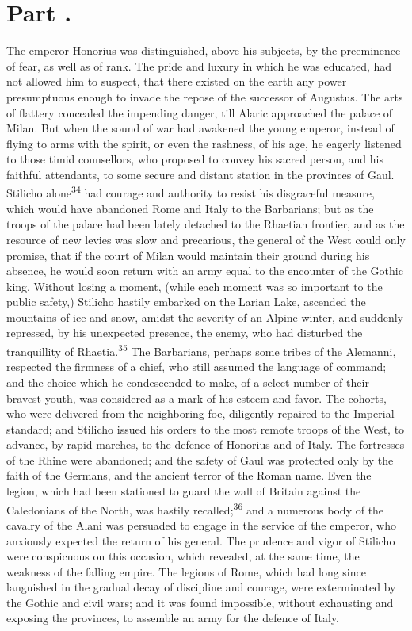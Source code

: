 \section{Part \thesection.}

The emperor Honorius was distinguished, above his subjects, by
the preeminence of fear, as well as of rank. The pride and luxury
in which he was educated, had not allowed him to suspect, that
there existed on the earth any power presumptuous enough to
invade the repose of the successor of Augustus. The arts of
flattery concealed the impending danger, till Alaric approached
the palace of Milan. But when the sound of war had awakened the
young emperor, instead of flying to arms with the spirit, or even
the rashness, of his age, he eagerly listened to those timid
counsellors, who proposed to convey his sacred person, and his
faithful attendants, to some secure and distant station in the
provinces of Gaul. Stilicho alone\textsuperscript{34} had courage and authority to
resist his disgraceful measure, which would have abandoned Rome
and Italy to the Barbarians; but as the troops of the palace had
been lately detached to the Rhaetian frontier, and as the
resource of new levies was slow and precarious, the general of
the West could only promise, that if the court of Milan would
maintain their ground during his absence, he would soon return
with an army equal to the encounter of the Gothic king. Without
losing a moment, (while each moment was so important to the
public safety,) Stilicho hastily embarked on the Larian Lake,
ascended the mountains of ice and snow, amidst the severity of an
Alpine winter, and suddenly repressed, by his unexpected
presence, the enemy, who had disturbed the tranquillity of
Rhaetia.\textsuperscript{35} The Barbarians, perhaps some tribes of the Alemanni,
respected the firmness of a chief, who still assumed the language
of command; and the choice which he condescended to make, of a
select number of their bravest youth, was considered as a mark of
his esteem and favor. The cohorts, who were delivered from the
neighboring foe, diligently repaired to the Imperial standard;
and Stilicho issued his orders to the most remote troops of the
West, to advance, by rapid marches, to the defence of Honorius
and of Italy. The fortresses of the Rhine were abandoned; and the
safety of Gaul was protected only by the faith of the Germans,
and the ancient terror of the Roman name. Even the legion, which
had been stationed to guard the wall of Britain against the
Caledonians of the North, was hastily recalled;\textsuperscript{36} and a numerous
body of the cavalry of the Alani was persuaded to engage in the
service of the emperor, who anxiously expected the return of his
general. The prudence and vigor of Stilicho were conspicuous on
this occasion, which revealed, at the same time, the weakness of
the falling empire. The legions of Rome, which had long since
languished in the gradual decay of discipline and courage, were
exterminated by the Gothic and civil wars; and it was found
impossible, without exhausting and exposing the provinces, to
assemble an army for the defence of Italy.


